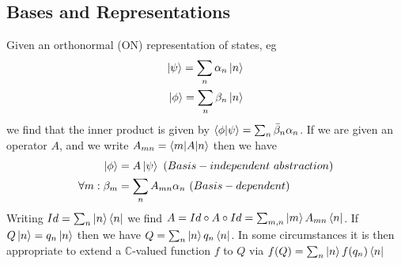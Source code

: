 \documentclass{article}
\begin{document}
\subsection{Bases and Representations}
Given an orthonormal (ON) representation of states, eg
\begin{align*}
  \ket\psi=\sum_n\alpha_n\ket n
  \\
  \ket\phi=\sum_n\beta_n\ket n
\end{align*}
we find that the inner product is given by $\braket{\phi|\psi}=\sum_n\bar\beta_n\alpha_n$.  If we are given an operator $A$, and we write $A_{mn}=\braket{m|A|n}$ then we have
\begin{align*}
  \ket \phi&=A\ket\psi~(Basis-independent~abstraction)
  \\
  \forall m :\beta_m&=\sum_nA_{mn}\alpha_n~(Basis-dependent)
\end{align*}
Writing $Id=\sum_n\ket n\bra n$ we find $A=Id\circ A\circ Id=\sum_{m,n}\ket mA_{mn}\bra{n}$.  If $Q\ket n =q_n \ket n$ then we have $Q=\sum_n \ket n q_n \bra n$.  In some circumstances it is then appropriate to extend a $\mathbb C $-valued function $f$ to $Q$ via $f(Q)=\sum_n \ket n f(q_n) \bra n$
\end{document}
